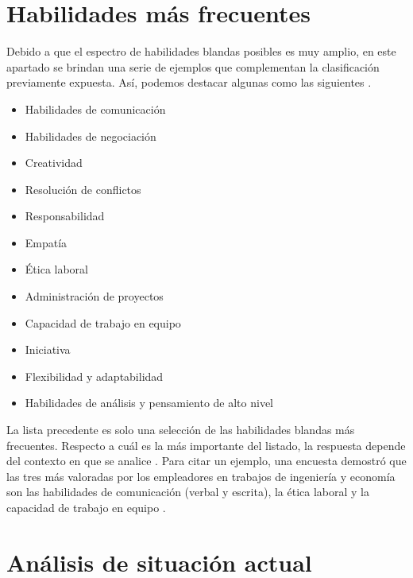 \documentclass[conference]{IEEEtran}
\begin{document}
\section{Habilidades más frecuentes }
\label{scrivauto:10}


Debido a que el espectro de habilidades blandas posibles es muy amplio, en este apartado se brindan una serie de ejemplos que complementan la clasificación previamente expuesta. Así, podemos destacar algunas como las siguientes \cite{b2} \cite{b3} \cite{b6}.

\begin{itemize}
    \item Habilidades de comunicación
    \item Habilidades de negociación
    \item Creatividad
    \item Resolución de conflictos
    \item Responsabilidad
    \item Empatía
    \item Ética laboral
    \item Administración de proyectos
    \item Capacidad de trabajo en equipo
    \item Iniciativa
    \item Flexibilidad y adaptabilidad
    \item Habilidades de análisis y pensamiento de alto nivel
\end{itemize}

La lista precedente es solo una selección de las habilidades blandas más frecuentes. Respecto a cuál es la más importante del listado, la respuesta depende del contexto en que se analice \cite{b3}. Para citar un ejemplo, una encuesta demostró que las tres más valoradas por los empleadores en trabajos de ingeniería y economía son las habilidades de comunicación (verbal y escrita), la ética laboral y la capacidad de trabajo en equipo \cite{b6} \cite{b1}.



\section{Análisis de situación actual}
\label{scrivauto:11}
\end{document}
